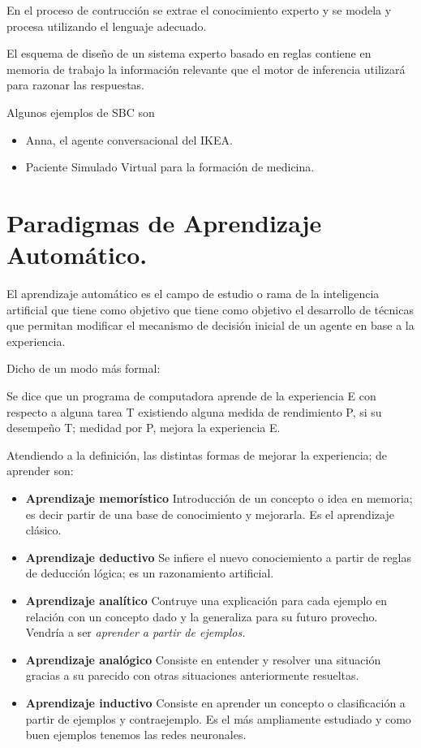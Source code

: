 \documentclass[12 pt, a4paper]{article}
\begin{document}
En el proceso de contrucción se extrae el conocimiento experto y se modela y procesa utilizando el lenguaje adecuado. 

El esquema de diseño de un sistema experto basado en reglas contiene en memoria de trabajo la información relevante que el motor
de inferencia utilizará para razonar las respuestas. 

Algunos ejemplos de SBC son 
\begin{itemize}
  \item Anna, el agente conversacional del IKEA.
  \item Paciente Simulado Virtual para la formación de medicina. 
\end{itemize}


\newpage

\section{Paradigmas de Aprendizaje Automático.}
El aprendizaje automático es el campo de estudio o rama de la inteligencia artificial que tiene como objetivo que 
tiene como objetivo el desarrollo de técnicas que permitan modificar el mecanismo de decisión 
inicial de un agente en base a la experiencia. 

Dicho de un modo más formal: 

Se dice que un programa de computadora aprende de la experiencia E con respecto a alguna tarea T existiendo alguna medida de rendimiento P, si 
su desempeño T;  medidad por P, mejora la experiencia E.


Atendiendo a la definición, las distintas formas de mejorar la experiencia; de aprender son: 

\begin{itemize}
  \item \textbf{Aprendizaje memorístico} Introducción de un concepto o idea en memoria; es decir partir de una base de conocimiento y mejorarla. Es el aprendizaje clásico. 
  \item \textbf{Aprendizaje deductivo} Se infiere el nuevo conociemiento a partir de reglas de deducción lógica; es un razonamiento artificial. 
  \item \textbf{Aprendizaje analítico}  Contruye una explicación para cada ejemplo en relación con un concepto dado y la generaliza para su futuro provecho. Vendría a ser 
  \textit{aprender a partir de ejemplos.} 
  \item \textbf{Aprendizaje analógico} Consiste en entender y resolver una situación gracias a su parecido con otras situaciones anteriormente resueltas. 
  \item \textbf{Aprendizaje inductivo}  Consiste en aprender un concepto o clasificación a partir de ejemplos y contraejemplo. Es el más ampliamente estudiado y como buen ejemplos 
  tenemos las redes neuronales. 
\end{itemize}
\end{document}
